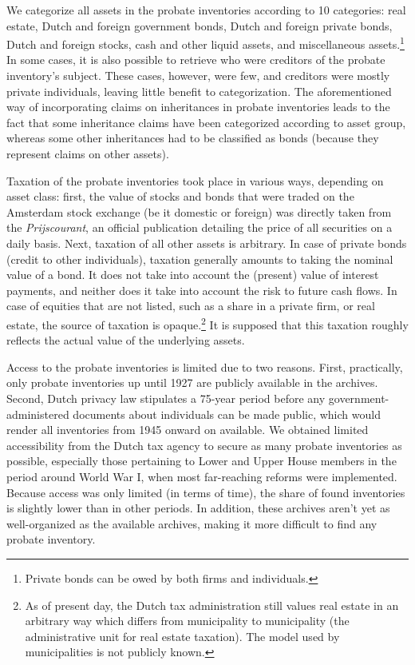 We categorize all assets in the probate inventories according to 10 categories: real estate, Dutch and foreign government bonds, Dutch and foreign private bonds, Dutch and foreign stocks, cash and other liquid assets, and miscellaneous assets.\footnote{Private bonds can be owed by  both firms and individuals.} In some cases, it is also possible to retrieve who were creditors of the probate inventory's subject. These cases, however, were few, and creditors were mostly private individuals, leaving little benefit to categorization. The aforementioned way of incorporating claims on inheritances in probate inventories leads to the fact that some inheritance claims have been categorized according to asset group, whereas some other inheritances had to be classified as bonds (because they represent claims on other assets). 

Taxation of the probate inventories took place in various ways, depending on asset class: first, the value of stocks and bonds that were traded on the Amsterdam stock exchange (be it domestic or foreign) was directly taken from the \textit{Prijscourant}, an official publication detailing the price of all securities on a daily basis. Next, taxation of all other assets is arbitrary. In case of private bonds (credit to other individuals), taxation generally amounts to taking the nominal value of a bond. It does not take into account the (present) value of interest payments, and neither does it take into account the risk to future cash flows. In case of equities that are not listed, such as a share in a private firm, or real estate, the source of taxation is opaque.\footnote{As of present day, the Dutch tax administration still values real estate in an arbitrary way which differs from municipality to municipality (the administrative unit for real estate taxation). The model used by municipalities is not publicly known.} It is supposed that this taxation roughly reflects the actual value of the underlying assets. 

Access to the probate inventories is limited due to two reasons. First, practically, only probate inventories up until 1927 are publicly available in the archives. Second, Dutch privacy law stipulates a 75-year period before any government-administered documents about individuals can be made public, which would render all inventories from 1945 onward on available. We obtained limited accessibility from the Dutch tax agency to secure as many probate inventories as possible, especially those pertaining to Lower and Upper House members in the period around World War I, when most far-reaching reforms were implemented. Because access was only limited (in terms of time), the share of found inventories is slightly lower than in other periods. In addition, these archives aren't yet as well-organized as the available archives, making it more difficult to find any probate inventory. 

